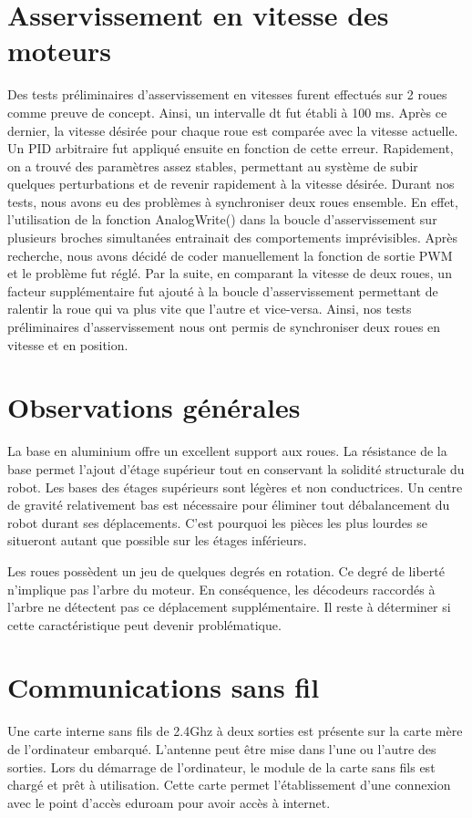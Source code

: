 \section{Asservissement en vitesse des moteurs}

Des tests préliminaires d'asservissement en vitesses furent effectués sur 2 roues comme preuve de concept. Ainsi, un intervalle dt fut établi à 100 ms. Après ce dernier, la vitesse désirée pour chaque roue est comparée avec la vitesse actuelle. Un PID arbitraire fut appliqué ensuite en fonction de cette erreur. Rapidement, on a trouvé des paramètres assez stables, permettant au système de subir quelques perturbations et de revenir rapidement à la vitesse désirée. Durant nos tests, nous avons eu des problèmes à synchroniser deux roues ensemble. En effet, l’utilisation de la fonction AnalogWrite() dans la boucle d’asservissement sur plusieurs broches simultanées entrainait des comportements imprévisibles. Après recherche, nous avons décidé de coder manuellement la fonction de sortie PWM et le problème fut réglé. Par la suite, en comparant la vitesse de deux roues, un facteur supplémentaire fut ajouté à la boucle d’asservissement permettant de ralentir la roue qui va plus vite que l’autre et vice-versa. Ainsi, nos tests préliminaires d’asservissement nous ont permis de synchroniser deux roues en vitesse et en position.

\section{Observations générales}
  La base en aluminium offre un excellent support aux roues. La résistance de la base permet l’ajout d’étage supérieur tout en conservant la solidité structurale du robot. Les bases des étages supérieurs sont légères et non conductrices. Un centre de gravité relativement bas est nécessaire pour éliminer tout débalancement du robot durant ses déplacements. C’est pourquoi les pièces les plus lourdes se situeront autant que possible sur les étages inférieurs.

Les roues possèdent un jeu de quelques degrés en rotation. Ce degré de liberté n’implique pas l’arbre du moteur. En conséquence, les décodeurs raccordés à l’arbre ne détectent pas ce déplacement supplémentaire. Il reste à déterminer si cette caractéristique peut devenir problématique. 

\section{Communications sans fil}
  Une carte interne sans fils de 2.4Ghz à deux sorties est présente sur la carte mère de l’ordinateur embarqué. L’antenne peut être mise dans l’une ou l’autre des sorties. Lors du démarrage de l’ordinateur, le module de la carte sans fils est chargé et prêt à utilisation. Cette carte permet l’établissement d’une connexion avec le point d’accès eduroam pour avoir accès à internet. 
 
